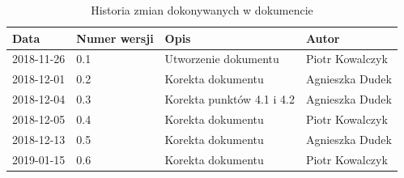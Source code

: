 \documentclass{article}
\begin{document}
\begin{titlepage}






\end{titlepage}

\addtocounter{page}{1}
\newpage

\begin{table}[h!]
	\begin{center}
		\caption{Historia zmian dokonywanych w dokumencie}
		\begin{tabular}{|l|l|l|l|}
			\hline
			Data & Numer wersji & Opis & Autor \\
			\hline \hline
			2018-11-26 & 0.1 & Utworzenie dokumentu & Piotr Kowalczyk \\
			\hline 
			2018-12-01 & 0.2 & Korekta dokumentu & Agnieszka Dudek \\
			\hline
			2018-12-04 & 0.3 & Korekta punktów 4.1 i 4.2 & Agnieszka Dudek \\
			\hline
			2018-12-05 & 0.4 & Korekta dokumentu & Piotr Kowalczyk \\
			\hline
			2018-12-13 & 0.5 & Korekta dokumentu & Agnieszka Dudek \\
			\hline
			2019-01-15 & 0.6 & Korekta dokumentu & Piotr Kowalczyk \\
			\hline			
    \end{tabular}
	\end{center}
\end{table}	
\end{document}
